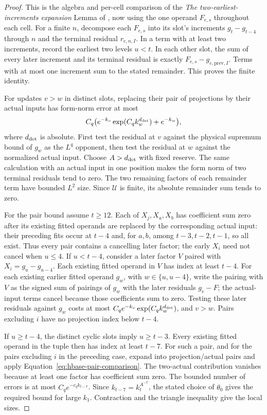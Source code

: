 \begin{proof}
This is the algebra and per-cell comparison of the
\emph{The two-earliest-increments expansion} Lemma of
\cite[Section~5]{H}, now using the one operand \(F_{e,s}\) throughout
each cell.  For a finite \(n\), decompose each \(F_{e,s}\) into its
slot's increments \(g_t-g_{t-4}\) through \(n\) and the terminal
residual \(r_{e,n,I}\).  In a term with at least two increments,
record the earliest two levels \(u<t\).  In each other slot, the
sum of every later increment and its terminal residual is exactly
\(F_{e,s}-g_{e,\mathrm{prev},I}\).  Terms with at most one increment
sum to the stated remainder.  This proves the finite identity.

For updates \(v>w\) in distinct slots, replacing their pair of
projections by their actual inputs has form-norm error at most
\begin{equation}
 C_q\bigl(e^{-k_v}\exp(C_qk_w^{d_{\rm det}})+e^{-k_w}\bigr),     \label{eq:hbase-pair-comparison}
\end{equation}
where \(d_{\rm det}\) is absolute.  First test the residual at \(v\)
against the physical supremum bound of \(g_w\) as the \(L^q\)
opponent, then test the residual at \(w\) against the normalized
actual input.  Choose \(A>d_{\rm det}\) with fixed reserve.  The
same calculation with an actual input in one position makes the
form norm of two terminal residuals tend to zero.  The two remaining
factors of each remainder term have bounded \(L^2\) size.  Since
\(\mathcal U\) is finite, its absolute remainder sum tends to zero.

For the pair bound assume \(t\ge12\).  Each of \(X_j,X_a,X_b\)
has coefficient sum zero after its existing fitted operands are
replaced by the corresponding actual input: their preceding fits
occur at \(t-4\) and, for \(a,b\), among \(t-3,t-2,t-1\), so all exist.
Thus every pair contains a cancelling later factor; the early \(X_i\)
need not cancel when \(u\le4\).  If \(u<t-4\), consider a later factor
\(V\) paired with \(X_i=g_u-g_{u-4}\).  Each existing fitted operand
in \(V\) has index at least \(t-4\).  For each existing earlier fitted
operand \(g_w\), with
\(w\in\{u,u-4\}\), write the pairing with \(V\)
as the signed sum of pairings of \(g_w\) with the later residuals
\(g_v-F\); the actual-input terms cancel because those coefficients
sum to zero.  Testing these later residuals against \(g_w\) costs
at most \(C_qe^{-k_v}\exp(C_qk_w^{d_{\rm det}})\), and \(v>w\).
Pairs excluding \(i\) have no projection index below \(t-4\).

If \(u\ge t-4\), the distinct cyclic slots imply \(u\ge t-3\).
Every existing fitted operand in the tuple then has index at least \(t-7\).
For such a pair, and for the pairs excluding \(i\) in the preceding
case, expand into projection/actual pairs and apply
Equation~\eqref{eq:hbase-pair-comparison}.  The two-actual contribution
vanishes because at least one factor has coefficient sum zero.
The bounded number of errors is at most
\(C_qe^{-c_qk_{t-7}}\).  Since \(k_{t-7}=k_t^{A^{-7}}\), the stated
choice of \(\theta_0\) gives the required bound for large \(k_1\).
Contraction and the triangle inequality give the local sizes.
\end{proof}

